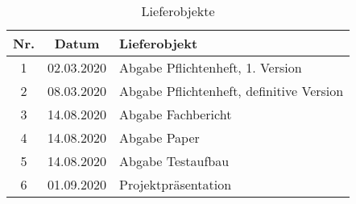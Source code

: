 \begin{table}[H]
     \centering
\begin{tabular}{|c|c|l|}\hline
   \textbf{Nr.} & \textbf{Datum} & \textbf{Lieferobjekt} \\ \hline
   
   1 & 02.03.2020 & Abgabe Pflichtenheft, 1. Version\\ \hline
   2 & 08.03.2020 & Abgabe Pflichtenheft, definitive Version\\ \hline
   3 & 14.08.2020 & Abgabe Fachbericht \\ \hline
   4 & 14.08.2020 & Abgabe Paper \\ \hline
   5 & 14.08.2020 & Abgabe Testaufbau \\ \hline
   6 & 01.09.2020 & Projektpräsentation \\ \hline
   
 \end{tabular}
     \caption{Lieferobjekte}
     \label{tbl:Lieferobjekte}
\end{table}